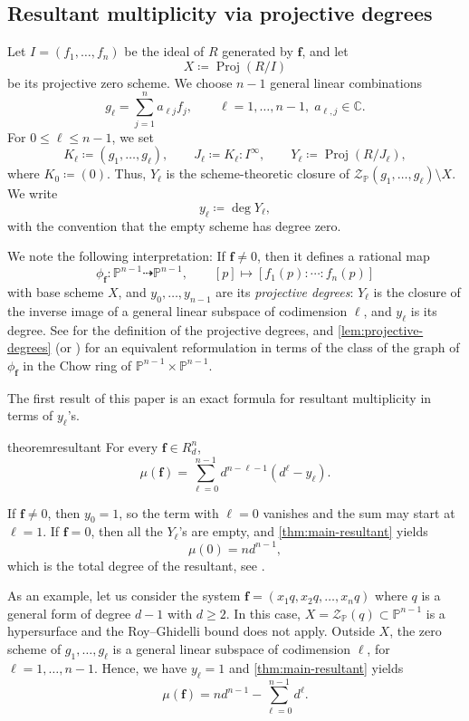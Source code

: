 \documentclass[11pt,letterpaper]{article}
\numberwithin{equation}{section}
\newcommand{\PP}{\mathbb{P}}
\newcommand{\CC}{\mathbb{C}}
\newcommand{\cZ}{\mathcal{Z}}
\newcommand{\ff}{\ensuremath{\boldsymbol{f}}}
\DeclareMathOperator{\Proj}{Proj}
\begin{document}
\subsection{Resultant multiplicity via projective degrees}
Let $I=(f_1,\ldots,f_n)$ be the ideal of $R$ generated by $\ff$, and let \[
X \coloneqq \Proj(R/I)
\] be its projective zero scheme.
We choose $n-1$ general linear combinations \[
g_{\ell} = \sum_{j=1}^n a_{\ell j} f_j, \qquad \ell=1,\ldots,n-1, \; a_{\ell,j}\in\CC.
\]
For $0\leq \ell\leq n-1$, we set \[
K_\ell \coloneqq (g_1,\ldots,g_\ell),\qquad J_\ell \coloneqq K_\ell : I^{\infty},\qquad Y_\ell \coloneqq \Proj(R/J_\ell),
\] 
where $K_0\coloneqq (0)$.
Thus, $Y_\ell$ is the scheme-theoretic closure of $
\cZ_{\PP}(g_1,\ldots,g_\ell)\setminus X.
$ We write \[
y_\ell\coloneqq \deg Y_\ell,
\] with the convention that the empty scheme has degree zero.

We note the following interpretation:
If $\ff\neq 0$, then it defines a rational map \[
\phi_{\ff}:\PP^{n-1}\dashrightarrow \PP^{n-1},\qquad [p]\mapsto [f_1(p):\cdots:f_n(p)]
\] with base scheme $X$, and $y_0,\ldots,y_{n-1}$ are its \emph{projective degrees}: 
$Y_\ell$ is the closure of the inverse image of a general linear subspace of codimension $\ell$, and $y_\ell$ is its degree.
See \cite[Example~19.4]{Harris-93} for the definition of the projective degrees,
and \cref{lem:projective-degrees} (or \cite[7.1.3]{Dolgachev-12}) for an equivalent reformulation in terms of the class of the graph of $\phi_{\ff}$ in the Chow ring of $\PP^{n-1}\times\PP^{n-1}$.

The first result of this paper is an exact formula for resultant multiplicity in terms of $y_\ell$'s.

\begin{restatable}{theorem}{resultant}
\label{thm:main-resultant}
For every $\ff\in R_d^n$, \[
\mu(\ff) = \sum_{\ell=0}^{n-1} d^{n-\ell-1} \left( d^\ell - y_\ell\right).
\]
\end{restatable}

If $\ff\neq 0$, then $y_0=1$, so the term with $\ell=0$ vanishes and the sum may start at $\ell=1$.
If $\ff=0$, then all the $Y_\ell$'s are empty, and \cref{thm:main-resultant} yields \[
\mu(0) = n d^{n-1},
\] which is the total degree of the resultant, see \cite[(3.1)~Theorem]{Cox-Little-Oshea-05}.

As an example, let us consider the system $\ff=(x_1 q,x_2q,\dots,x_n q)$ where $q$ is a general form of degree $d-1$ with $d\geq 2$.
In this case, $X=\cZ_{\PP}(q)\subset\PP^{n-1}$ is a hypersurface and the Roy--Ghidelli bound does not apply.
Outside $X$, the zero scheme of $g_1,\dots,g_\ell$ is a general linear subspace of codimension $\ell$, for $\ell=1,\dots,n-1$.
Hence, we have $y_\ell=1$ and
\cref{thm:main-resultant} yields \[
\mu(\ff) = nd^{n-1} - \sum_{\ell=0}^{n-1} d^{\ell}.
\]
\end{document}
